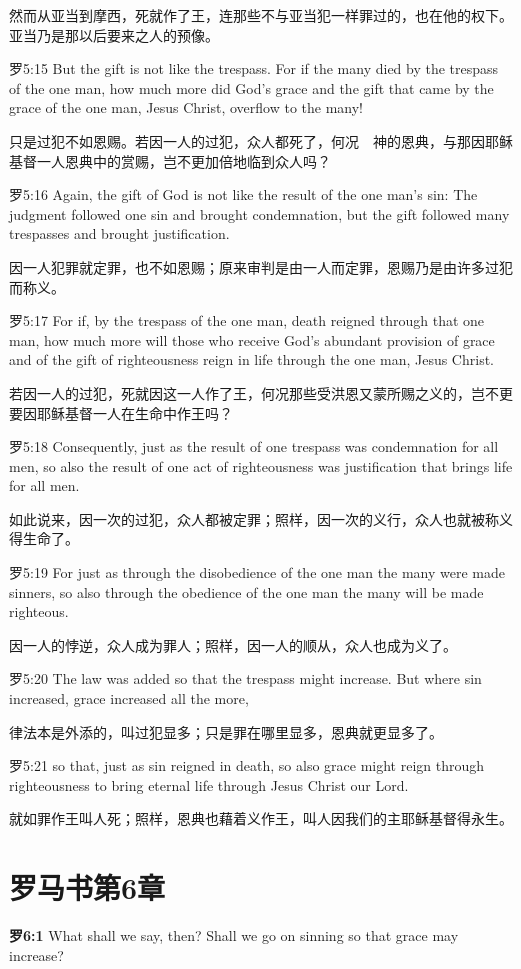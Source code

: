 \documentclass[a4paper,11pt,onecolumn,twoside]{ctexart}
\begin{document}
\begin{multicols}{2}
 然而从亚当到摩西，死就作了王，连那些不与亚当犯一样罪过的，也在他的权下。亚当乃是那以后要来之人的预像。


 罗5:15
 But the gift is not like the trespass. For if the many died by the trespass of the one man, how much more did God's grace and the gift that came by the grace of the one man, Jesus Christ, overflow to the many!

 只是过犯不如恩赐。若因一人的过犯，众人都死了，何况　神的恩典，与那因耶稣基督一人恩典中的赏赐，岂不更加倍地临到众人吗？


 罗5:16
 Again, the gift of God is not like the result of the one man's sin: The judgment followed one sin and brought condemnation, but the gift followed many trespasses and brought justification.

 因一人犯罪就定罪，也不如恩赐；原来审判是由一人而定罪，恩赐乃是由许多过犯而称义。


 罗5:17
 For if, by the trespass of the one man, death reigned through that one man, how much more will those who receive God's abundant provision of grace and of the gift of righteousness reign in life through the one man, Jesus Christ.

 若因一人的过犯，死就因这一人作了王，何况那些受洪恩又蒙所赐之义的，岂不更要因耶稣基督一人在生命中作王吗？


 罗5:18
 Consequently, just as the result of one trespass was condemnation for all men, so also the result of one act of righteousness was justification that brings life for all men.

 如此说来，因一次的过犯，众人都被定罪；照样，因一次的义行，众人也就被称义得生命了。


 罗5:19
 For just as through the disobedience of the one man the many were made sinners, so also through the obedience of the one man the many will be made righteous.

 因一人的悖逆，众人成为罪人；照样，因一人的顺从，众人也成为义了。


 罗5:20
 The law was added so that the trespass might increase. But where sin increased, grace increased all the more,

 律法本是外添的，叫过犯显多；只是罪在哪里显多，恩典就更显多了。


 罗5:21
 so that, just as sin reigned in death, so also grace might reign through righteousness to bring eternal life through Jesus Christ our Lord.

 就如罪作王叫人死；照样，恩典也藉着义作王，叫人因我们的主耶稣基督得永生。


\section{ 罗马书第6章}
 \textbf{罗6:1}
 What shall we say, then? Shall we go on sinning so that grace may increase?


\end{multicols}
\end{document}
